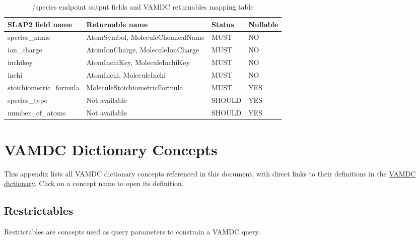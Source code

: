 \documentclass[11pt,a4paper]{ivoa}
\begin{document}
\begin{table}[H]
\centering
\footnotesize
\begin{tabularx}{\textwidth}{|p{5cm}|>{\raggedright\arraybackslash}X|p{2.5cm}|p{1.5cm}|}
\hline
\headerstrut\textbf{SLAP2 field name} & \textbf{Returnable name} & \textbf{Status}  & \textbf{Nullable}  \\
\hline
species\_name                     & AtomSymbol, Molecule\-Chemical\-Name    & MUST     &  NO   \\
ion\_charge                       & Atom\-Ion\-Charge, Molecule\-Ion\-Charge & MUST     &  NO   \\
inchikey                          & Atom\-Inchi\-Key, Molecule\-Inchi\-Key   & MUST     &  NO   \\
inchi                             & AtomInchi, MoleculeInchi                & MUST     &  NO   \\
stoichiometric\_formula           & Molecule\-Stoichio\-metric\-Formula      & MUST     &  YES  \\
species\_type                     & Not available                    & SHOULD   &  YES  \\
number\_of\_atoms                 & Not available                    & SHOULD   &  YES  \\

\hline
\end{tabularx}
\caption{/species endpoint output fields and VAMDC returnables mapping table}
\end{table}

\section{VAMDC Dictionary Concepts}
\label{sec:vamdc-concepts}

This appendix lists all VAMDC dictionary concepts referenced in this document,
with direct links to their definitions in the
\href{https://dictionary.vamdc.eu/}{VAMDC dictionary}.
Click on a concept name to open its definition.

\subsection*{Restrictables}

Restrictables are concepts used as query parameters to constrain a VAMDC query.
\end{document}
